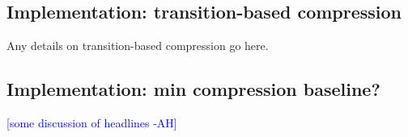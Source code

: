 \documentclass[11pt,a4paper]{article}
\newcommand{\ahcomment}[1]{\textcolor{blue}{[#1 -AH]}}
\DeclareMathOperator*{\argmaxA}{arg\,max} %
\begin{document}

\subsection{Implementation: transition-based compression}\label{s:transition}

Any details on transition-based compression go here.





\subsection{Implementation: min compression baseline? }\label{s:transition}
\ahcomment{some discussion of headlines}
\end{document}
